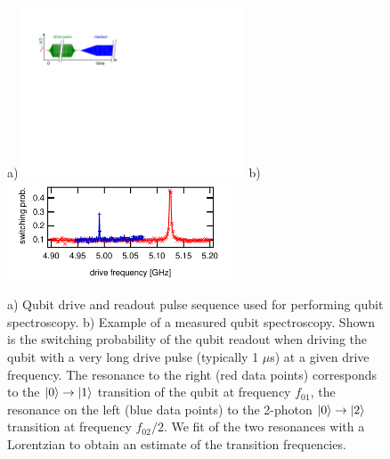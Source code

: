 \begin{figure}[ht!]
\centering
a)\includegraphics[width=0.6\textwidth]{"./material/figures/measurement/qubit_spectroscopy"}
b)\includegraphics[width=0.6\textwidth]{"./data/ct5/2011_04_21 - grover and tomo/example - qubit 2 spectroscopy"}
\caption[]{a) Qubit drive and readout pulse sequence used for performing qubit spectroscopy. b) Example of a measured qubit spectroscopy. Shown is the switching probability of the qubit readout when driving the qubit with a very long drive pulse (typically 1 $\mu$s) at a given drive frequency. The resonance to the right (red data points) corresponds to the $\left| 0 \right>\to\left| 1 \right>$ transition of the qubit at frequency $f_{01}$, the resonance on the left (blue data points) to the 2-photon $\left| 0 \right>\to\left| 2 \right>$ transition at frequency $f_{02}/2$. We fit of the two resonances with a Lorentzian to obtain an estimate of the transition frequencies.}
\label{fig:qubit_spectroscopy_example}
\end{figure}


